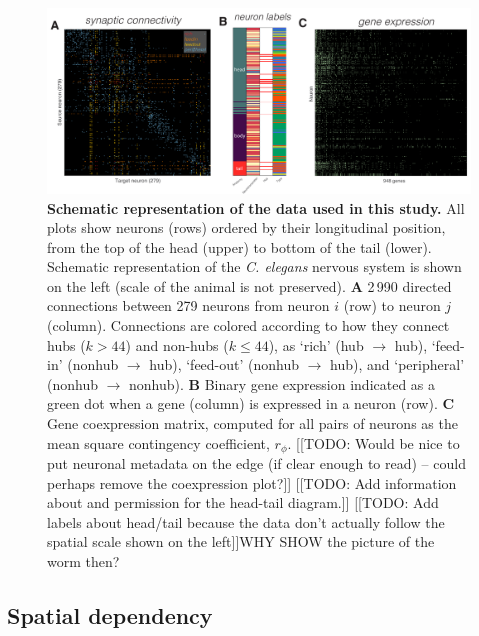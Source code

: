 \documentclass[10pt,letterpaper]{article}
\begin{document}
\begin{figure}[h]
  \centering
    \includegraphics[width=1\textwidth]{SchematicIndicators.pdf}
 \caption{\textbf{Schematic representation of the data used in this study.}
All plots show neurons (rows) ordered by their longitudinal position, from the top of the head (upper) to bottom of the tail (lower).
Schematic representation of the \textit{C. elegans} nervous system is shown on the left (scale of the animal is not preserved).
 \textbf{A} 2\,990 directed connections between 279 neurons from neuron $i$ (row) to neuron $j$ (column).
Connections are colored according to how they connect hubs ($k > 44$) and non-hubs ($k \leq 44$), as `rich' (hub $\rightarrow$ hub), `feed-in' (nonhub $\rightarrow$ hub), `feed-out' (nonhub $\rightarrow$ hub), and `peripheral' (nonhub $\rightarrow$ nonhub).
  \textbf{B} Binary gene expression indicated as a green dot when a gene (column) is expressed in a neuron (row).
 \textbf{C} Gene coexpression matrix, computed for all pairs of neurons as the mean square contingency coefficient, $r_\phi$.
[[TODO: Would be nice to put neuronal metadata on the edge (if clear enough to read) -- could perhaps remove the coexpression plot?]]
[[TODO: Add information about and permission for the head-tail diagram.]]
[[TODO: Add labels about head/tail because the data don't actually follow the spatial scale shown on the left]]WHY SHOW the picture of the worm then?
}
\label{fig:SchematicRepresentation}
\end{figure}


\subsection*{Spatial dependency}
\end{document}
